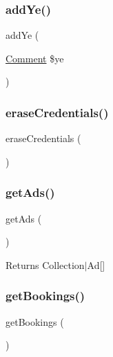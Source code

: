 \mbox{\label{class_app_1_1_entity_1_1_user_a711777ae6a0783700bbe5a8903690551}} 
\subsubsection{\texorpdfstring{addYe()}{addYe()}}
{\footnotesize\ttfamily add\+Ye (\begin{DoxyParamCaption}\item[{\mbox{\hyperlink{class_app_1_1_entity_1_1_comment}{Comment}}}]{\$ye }\end{DoxyParamCaption})}

\mbox{\label{class_app_1_1_entity_1_1_user_ac565b8c00fe93ce673f8237849f072a6}} 
\subsubsection{\texorpdfstring{eraseCredentials()}{eraseCredentials()}}
{\footnotesize\ttfamily erase\+Credentials (\begin{DoxyParamCaption}{ }\end{DoxyParamCaption})}

\mbox{\label{class_app_1_1_entity_1_1_user_ac3c8999d4e6f0c34294f36a2096592f2}} 
\subsubsection{\texorpdfstring{getAds()}{getAds()}}
{\footnotesize\ttfamily get\+Ads (\begin{DoxyParamCaption}{ }\end{DoxyParamCaption})}

\begin{DoxyReturn}{Returns}
Collection$\vert$\+Ad\mbox{[}\mbox{]} 
\end{DoxyReturn}
\mbox{\label{class_app_1_1_entity_1_1_user_a3dba7af3ac89f0c7c191024c2bcbf2e5}} 
\subsubsection{\texorpdfstring{getBookings()}{getBookings()}}
{\footnotesize\ttfamily get\+Bookings (\begin{DoxyParamCaption}{ }\end{DoxyParamCaption})}

